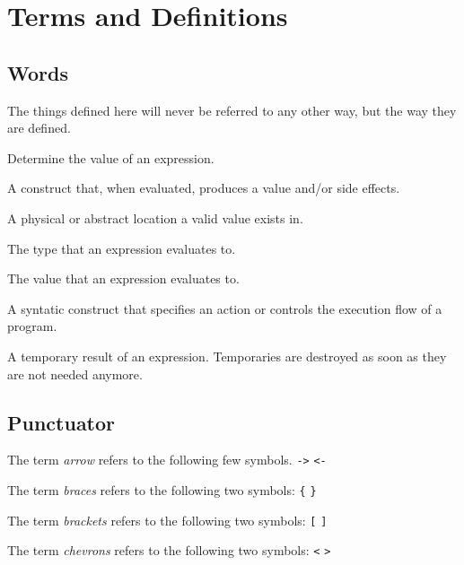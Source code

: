 \chapter{Terms and Definitions}

\section{Words}
The things defined here will never be referred to any other way, but the way they are defined.


\subpara Determine the value of an expression.
    
\subpara A construct that, when evaluated, produces a value and/or side effects.
    
\subpara A physical or abstract location a valid value exists in.

\subpara The type that an expression evaluates to.
    
\subpara The value that an expression evaluates to.
    
\subpara A syntatic construct that specifies an action or controls the execution flow of a program.

\subpara A temporary result of an expression. Temporaries are destroyed as soon as they are not needed anymore.
    


\section{Punctuator}


\para The term \textit{arrow} refers to the following few symbols.
 \texttt{->}
 \texttt{<-}

\para The term \textit{braces} refers to the following two symbols:
 \texttt{\{}
 \texttt{\}}

\para The term \textit{brackets} refers to the following two symbols:
 \texttt{[}
 \texttt{]}

\para The term \textit{chevrons} refers to the following two symbols:
 \texttt{<}
 \texttt{>}

